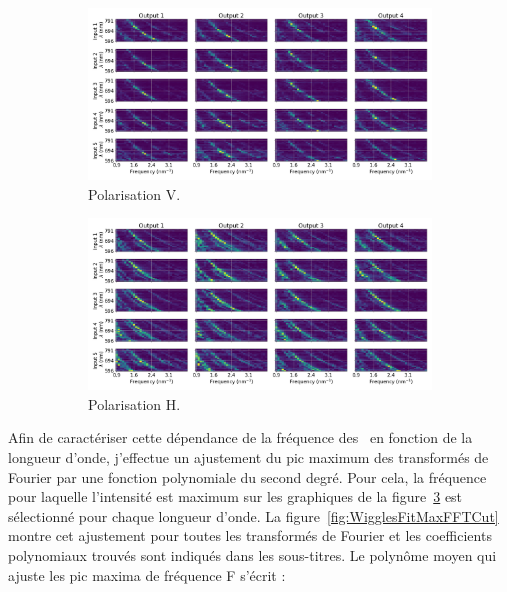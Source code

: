 \begin{figure}[ht!]
    \centering
    \begin{subfigure}{0.8\textwidth}
        \centering
        \includegraphics[width=\textwidth]{Figure_Chap4/20220811_P2VM_01_Flat1_InputOutput_Spectra_fft_VS_Wave_Pola1_Base.png}
        \caption{Polarisation V.}
        \label{fig:WigglesFFTCutA}
    \end{subfigure}
    \begin{subfigure}{0.8\textwidth}
        \centering
        \includegraphics[width=\textwidth]{Figure_Chap4/20220811_P2VM_01_Flat1_InputOutput_Spectra_fft_VS_Wave_Pola2_Base.png}
        \caption{Polarisation H.}
        \label{fig:WigglesFFTCutB}
    \end{subfigure}
    \caption[]{}
    \label{fig:WigglesFFTCut}
\end{figure}

Afin de caractériser cette dépendance de la fréquence des \wiggles~en fonction de la longueur d'onde, j'effectue un ajustement du pic maximum des transformés de Fourier par une fonction polynomiale du second degré. Pour cela, la fréquence pour laquelle l'intensité est maximum sur les graphiques de la figure~\ref{fig:WigglesFFTCut} est sélectionné pour chaque longueur d'onde. La figure~\ref{fig:WigglesFitMaxFFTCut} montre cet ajustement pour toutes les transformés de Fourier et les coefficients polynomiaux trouvés sont indiqués dans les sous-titres. Le polynôme moyen qui ajuste les pic maxima de fréquence F s'écrit :

